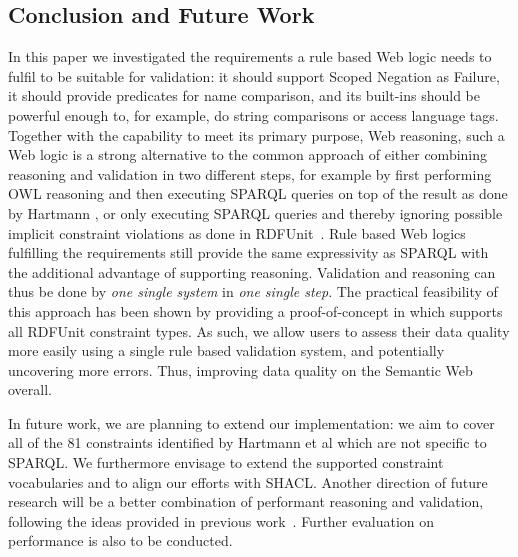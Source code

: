 \subsection{Conclusion and Future Work}\label{conc}
In this paper we investigated the requirements a rule based Web logic needs to fulfil to be suitable for \rdf validation:
it should support Scoped Negation as Failure, it should provide predicates for name comparison, and its built-ins should be powerful enough to, for example, 
do string comparisons or access language tags.  Together with the capability to meet its primary purpose, Web reasoning, such a Web logic is
a strong alternative to the common approach of either combining reasoning and validation in two different steps, for example by first performing OWL reasoning and 
then executing SPARQL queries on top of the result as done by Hartmann \cite{hartmann2016}, or only executing SPARQL queries and thereby ignoring possible 
implicit constraint violations
as done in RDFUnit~\cite{kontokostas2014test}. Rule based Web logics fulfilling the requirements still provide the same expressivity as SPARQL with the additional advantage
of supporting reasoning. Validation and reasoning can thus be done by \emph{one single system} in \emph{one single step}. 
%
The practical feasibility of this approach has been shown by providing a proof-of-concept in \nthreelogic which supports all RDFUnit constraint types. 
As such, we allow users to assess 
their data quality more easily using a single rule based validation system, and potentially uncovering more errors. Thus, improving data quality on the Semantic Web overall.

In future work, we are planning to extend our implementation:
we aim to cover all of the 81 constraints identified by Hartmann et al \cite{bosch2015} which are not specific to SPARQL. We furthermore 
envisage to extend the supported \rdf constraint vocabularies and to align our efforts with SHACL.  
Another direction of future research will be a better combination of performant reasoning and validation, following the ideas provided in previous work~\cite{arndt_owled_2015}.
Further evaluation on performance is also to be conducted.

